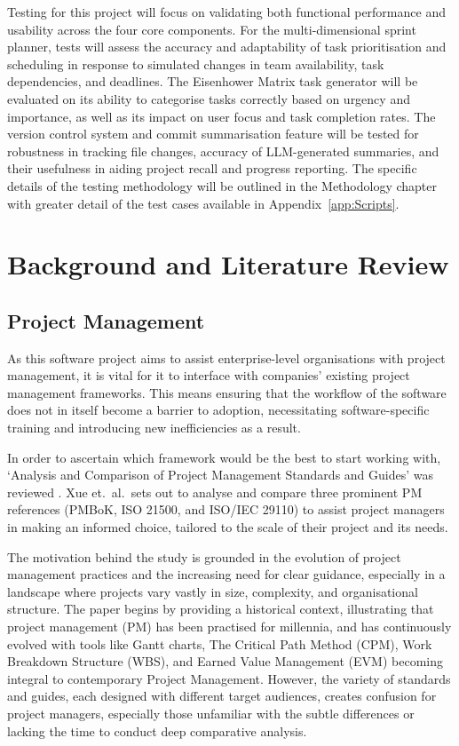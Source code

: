 \documentclass{report}
\begin{document}
Testing for this project will focus on validating both functional performance and usability across the four core components. 
For the multi-dimensional sprint planner, tests will assess the accuracy and adaptability of task prioritisation and scheduling in response to simulated changes in team availability, task dependencies, and deadlines. 
The Eisenhower Matrix task generator will be evaluated on its ability to categorise tasks correctly based on urgency and importance, as well as its impact on user focus and task completion rates.
The version control system and commit summarisation feature will be tested for robustness in tracking file changes, accuracy of LLM-generated summaries, and their usefulness in aiding project recall and progress reporting. 
The specific details of the testing methodology will be outlined in the Methodology chapter with greater detail of the test cases available in Appendix~\ref{app:Scripts}.

\chapter{Background and Literature Review}  %
\section{Project Management}

As this software project aims to assist enterprise-level organisations with project management, it is vital for it to interface with companies' existing project management frameworks. 
This means ensuring that the workflow of the software does not in itself become a barrier to adoption, necessitating software-specific training and introducing new inefficiencies as a result.

In order to ascertain which framework would be the best to start working with, `Analysis and Comparison of Project Management Standards and Guides' was reviewed \parencite{xueAnalysisComparisonProject}.
Xue et.\ al.\ sets out to analyse and compare three prominent PM references (PMBoK, ISO 21500, and ISO/IEC 29110) to assist project managers in making an informed choice, tailored to the scale of their project and its needs.

The motivation behind the study is grounded in the evolution of project management practices and the increasing need for clear guidance, especially in a landscape where projects vary vastly in size, complexity, and organisational structure. 
The paper begins by providing a historical context, illustrating that project management (PM) has been practised for millennia, and has continuously evolved with tools like Gantt charts, The Critical Path Method (CPM), Work Breakdown Structure (WBS), and Earned Value Management (EVM) becoming integral to contemporary Project Management.  
However, the variety of standards and guides, each designed with different target audiences, creates confusion for project managers, especially those unfamiliar with the subtle differences or lacking the time to conduct deep comparative analysis.
\end{document}
